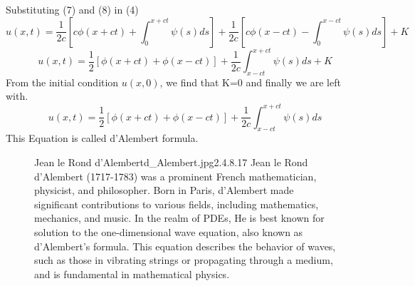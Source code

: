 Substituting (7) and (8) in (4)
\[
    u\left(x,t\right) = \frac{1}{2c}\left[c\phi\left(x+ct\right)+\int_{0}^{x+ct} \psi\left(s\right)ds\right]+\frac{1}{2c}\left[c\phi\left(x-ct\right)-\int_{0}^{x-ct} \psi\left(s\right)ds\right]+K    
\]
\[
    u\left(x,t\right) = \frac{1}{2}\left[\phi\left(x+ct\right)+\phi\left(x-ct\right)\right]+\frac{1}{2c}\int_{x-ct}^{x+ct} \psi\left(s\right)ds + K    
\]
From the initial condition $u(x,0)$, we find that K=0 and finally we are left with.
\[
    u\left(x,t\right) = \frac{1}{2}\left[\phi\left(x+ct\right)+\phi\left(x-ct\right)\right]+\frac{1}{2c}\int_{x-ct}^{x+ct} \psi\left(s\right)ds    
\]
This Equation is called d'Alembert formula.
\begin{figure}[b]
    \begin{minipage}[h]{\textwidth}
    \begin{enrichment}{Jean le Rond d'Alembert}{d_Alembert.jpg}{2.4}{.8}{.17}
        Jean le Rond d'Alembert (1717-1783) was a prominent French mathematician, physicist, and philosopher. Born in Paris, d'Alembert made significant contributions to various fields, including mathematics, mechanics, and music.
        In the realm of PDEs, He is best known for solution to the one-dimensional wave equation, also known as d'Alembert's formula. This equation describes the behavior of waves, such as those in vibrating strings or propagating through a medium, and is fundamental in mathematical physics.
    \end{enrichment}    
\end{minipage}
\end{figure}
\newpage
\setcounter{equation}{0}

